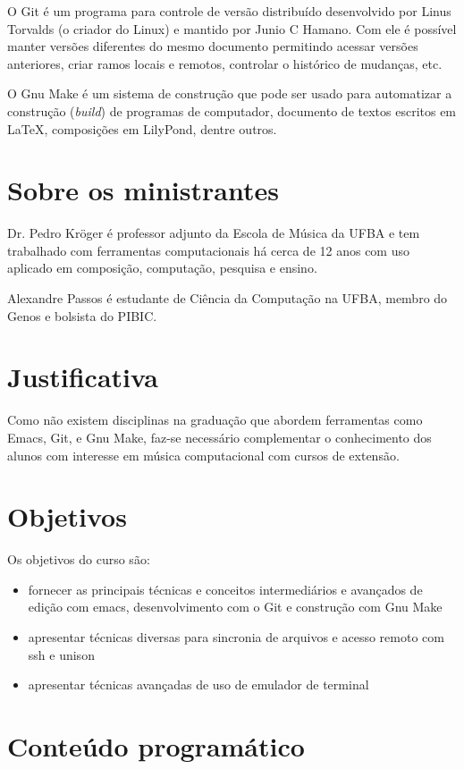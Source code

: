 \documentclass[12pt,brazil]{article}
\begin{document}
O Git é um programa para controle de versão distribuído desenvolvido
por Linus Torvalds (o criador do Linux) e mantido por Junio C Hamano.
Com ele é possível manter versões diferentes do mesmo documento
permitindo acessar versões anteriores, criar ramos locais e remotos,
controlar o histórico de mudanças, etc.

O Gnu Make é um sistema de construção que pode ser usado para
automatizar a construção (\textit{build}) de programas de computador,
documento de textos escritos em \LaTeX, composições em LilyPond,
dentre outros.

\section{Sobre os ministrantes} 

Dr. Pedro Kröger é professor adjunto da Escola de Música da UFBA e tem
trabalhado com ferramentas computacionais há cerca de 12 anos com uso
aplicado em composição, computação, pesquisa e ensino.

Alexandre Passos é estudante de Ciência da Computação na UFBA, membro
do Genos e bolsista do PIBIC.

\section{Justificativa}

Como não existem disciplinas na graduação que abordem ferramentas como
Emacs, Git, e Gnu Make, faz-se necessário complementar o conhecimento
dos alunos com interesse em música computacional com cursos de
extensão.

\section{Objetivos}

Os objetivos do curso são:

\begin{itemize}
\item fornecer as principais técnicas e conceitos intermediários e
  avançados de edição com emacs, desenvolvimento com o Git e
  construção com Gnu Make
\item apresentar técnicas diversas para sincronia de arquivos e acesso
  remoto com ssh e unison
\item apresentar técnicas avançadas de uso de emulador de terminal
\end{itemize}

\section{Conteúdo programático} 
\end{document}
